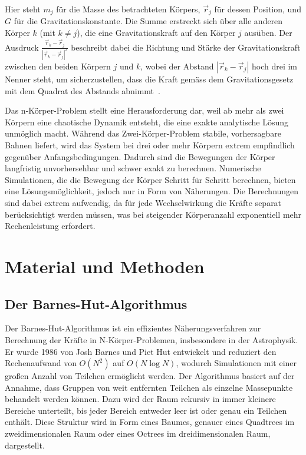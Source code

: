 \documentclass[a4paper,12pt,twoside]{article}
\begin{document}
Hier steht \( m_j \) für die Masse des betrachteten Körpers, \( \vec{r}_j \) für dessen Position, und \( G \) für die Gravitationskonstante. Die Summe erstreckt sich über alle anderen Körper \( k \) (mit \( k \neq j \)), die eine Gravitationskraft auf den Körper \( j \) ausüben. Der Ausdruck \( \frac{\vec{r}_k - \vec{r}_j}{|\vec{r}_k - \vec{r}_j|^3} \) beschreibt dabei die Richtung und Stärke der Gravitationskraft zwischen den beiden Körpern \( j \) und \( k \), wobei der Abstand \( |\vec{r}_k - \vec{r}_j| \) hoch drei im Nenner steht, um sicherzustellen, dass die Kraft gemäss dem Gravitationsgesetz mit dem Quadrat des Abstands abnimmt~\cite{Schäfer2017}.

Das n-Körper-Problem stellt eine Herausforderung dar, weil ab mehr als zwei Körpern eine chaotische Dynamik entsteht, die eine exakte analytische Lösung unmöglich macht. Während das Zwei-Körper-Problem stabile, vorhersagbare Bahnen liefert, wird das System bei drei oder mehr Körpern extrem empfindlich gegenüber Anfangsbedingungen.
Dadurch sind die Bewegungen der Körper langfristig unvorhersehbar und schwer exakt zu berechnen. Numerische Simulationen, die die Bewegung der Körper Schritt für Schritt berechnen, bieten eine Lösungsmöglichkeit, jedoch nur in Form von Näherungen. Die Berechnungen sind dabei extrem aufwendig, da für jede Wechselwirkung die Kräfte separat berücksichtigt werden müssen, was bei steigender Körperanzahl exponentiell mehr Rechenleistung erfordert.


\section{Material und Methoden}

\subsection{Der Barnes-Hut-Algorithmus}
Der Barnes-Hut-Algorithmus ist ein effizientes Näherungsverfahren zur Berechnung der Kräfte in N-Körper-Problemen, insbesondere in der Astrophysik. Er wurde 1986 von Josh Barnes und Piet Hut entwickelt und reduziert den Rechenaufwand von $O(N^2)$ auf $O(N \log N)$, wodurch Simulationen mit einer großen Anzahl von Teilchen ermöglicht werden.
Der Algorithmus basiert auf der Annahme, dass Gruppen von weit entfernten Teilchen als einzelne Massepunkte behandelt werden können. Dazu wird der Raum rekursiv in immer kleinere Bereiche unterteilt, bis jeder Bereich entweder leer ist oder genau ein Teilchen enthält. Diese Struktur wird in Form eines Baumes, genauer eines Quadtrees im zweidimensionalen Raum oder eines Octrees im dreidimensionalen Raum, dargestellt.
\end{document}
